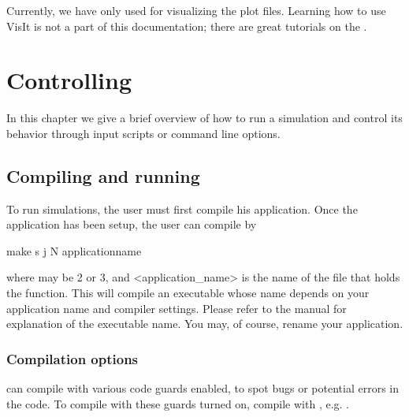 \documentclass[letterpaper,10pt,english]{sphinxmanual}
\begin{document}
\sphinxAtStartPar
Currently, we have only used  for visualizing the plot files.
Learning how to use VisIt is not a part of this documentation; there are great tutorials on the .

\sphinxstepscope


\section{Controlling }
\label{\detokenize{Base/Control:controlling-chombo-discharge}}\label{\detokenize{Base/Control:chap-control}}\label{\detokenize{Base/Control::doc}}
\sphinxAtStartPar
In this chapter we give a brief overview of how to run a  simulation and control its behavior through input scripts or command line options.


\subsection{Compiling and running}
\label{\detokenize{Base/Control:compiling-and-running}}
\sphinxAtStartPar
To run simulations, the user must first compile his application.
Once the application has been setup, the user can compile by

\begin{sphinxVerbatim}[commandchars=\\\{\},formatcom=\scriptsize]
make \PYGZhy{}s \PYGZhy{}j  N \PYGZlt{}application\PYGZus{}name\PYGZgt{}
\end{sphinxVerbatim}

\sphinxAtStartPar
where  may be 2 or 3, and \textless{}application\_name\textgreater{} is the name of the file that holds the  function.
This will compile an executable whose name depends on your application name and compiler settings.
Please refer to the  manual for explanation of the executable name. You may, of course, rename your application.


\subsubsection{Compilation options}
\label{\detokenize{Base/Control:compilation-options}}
\sphinxAtStartPar
{} can compile with various code guards enabled, to spot bugs or potential errors in the code.
To compile with these guards turned on, compile with , e.g. .
\end{document}
